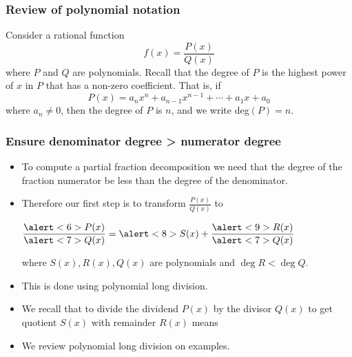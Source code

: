 \begin{frame}
\frametitle{Review of polynomial notation}
Consider a rational function
\[
f(x) = \frac{P(x)}{Q(x)}
\]
where $P$ and $Q$ are polynomials.  Recall that the degree of $P$ is the highest power of $x$ in $P$ that has a non-zero coefficient.  That is, if
\[
P(x) = a_nx^n + a_{n-1}x^{n-1} + \cdots + a_1x + a_0
\]
where $a_n \neq 0$, then the degree of $P$ is $n$, and we write deg$(P) = n$.

\end{frame}
\begin{frame}\frametitle{Ensure denominator degree > numerator degree}
\begin{itemize}
\item To compute a partial fraction decomposition we need that the degree of the fraction numerator be less than the degree of the denominator.
\item<2-> Therefore our first step is to transform $\frac{P(x)}{Q(x)}$ to

$\displaystyle \frac{\alert<6>{P(x)}}{\alert<7>{Q(x)} }= \alert<8>{S(x)}+\frac{\alert<9>{R(x)}}{\alert<7>{Q(x)}} $

where $S(x), R(x), Q(x)$ are polynomials and $\deg R<\deg Q$.
\item<3-> This is done using polynomial long division.
\item<4-> We recall that to divide the \alert<6>{dividend $P(x)$} by the \alert<7>{divisor $Q(x)$} to get \alert<8>{quotient $S(x)$} with \alert<9>{remainder $R(x)$} means 
\item<10-> We review polynomial long division on examples.
\end{itemize}



\end{frame}
